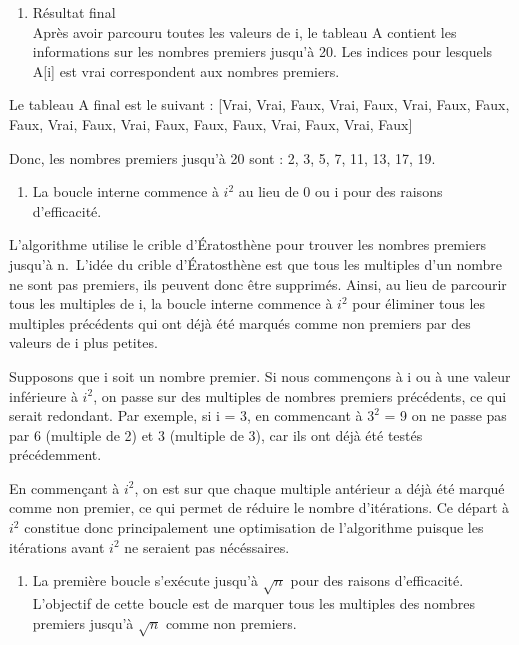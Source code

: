 \documentclass[
    ]{article}
\providecommand{\tightlist}{%
  \setlength{\itemsep}{0pt}\setlength{\parskip}{0pt}}
\begin{document}
\begin{enumerate}
\def\labelenumi{\Alph{enumi})}
\setcounter{enumi}{2}
\tightlist
\item
  Résultat final\\
  Après avoir parcouru toutes les valeurs de i, le tableau A contient
  les informations sur les nombres premiers jusqu'à 20. Les indices pour
  lesquels A{[}i{]} est vrai correspondent aux nombres premiers.
\end{enumerate}

Le tableau A final est le suivant : {[}Vrai, Vrai, Faux, Vrai, Faux,
Vrai, Faux, Faux, Faux, Vrai, Faux, Vrai, Faux, Faux, Faux, Vrai, Faux,
Vrai, Faux{]}

Donc, les nombres premiers jusqu'à 20 sont : 2, 3, 5, 7, 11, 13, 17, 19.

\begin{enumerate}
\def\labelenumi{\arabic{enumi}.}
\setcounter{enumi}{1}
\tightlist
\item
  La boucle interne commence à \(i^2\) au lieu de 0 ou i pour des
  raisons d'efficacité.
\end{enumerate}

L'algorithme utilise le crible d'Ératosthène pour trouver les nombres
premiers jusqu'à n.~L'idée du crible d'Ératosthène est que tous les
multiples d'un nombre ne sont pas premiers, ils peuvent donc être
supprimés. Ainsi, au lieu de parcourir tous les multiples de i, la
boucle interne commence à \(i^2\) pour éliminer tous les multiples
précédents qui ont déjà été marqués comme non premiers par des valeurs
de i plus petites.

Supposons que i soit un nombre premier. Si nous commençons à i ou à une
valeur inférieure à \(i^2\), on passe sur des multiples de nombres
premiers précédents, ce qui serait redondant. Par exemple, si i = 3, en
commencant à \(3^2\) = 9 on ne passe pas par 6 (multiple de 2) et 3
(multiple de 3), car ils ont déjà été testés précédemment.

En commençant à \(i^2\), on est sur que chaque multiple antérieur a déjà
été marqué comme non premier, ce qui permet de réduire le nombre
d'itérations. Ce départ à \(i^2\) constitue donc principalement une
optimisation de l'algorithme puisque les itérations avant \(i^2\) ne
seraient pas nécéssaires.

\begin{enumerate}
\def\labelenumi{\arabic{enumi}.}
\setcounter{enumi}{2}
\tightlist
\item
  La première boucle s'exécute jusqu'à \(\sqrt{n}\) pour des raisons
  d'efficacité. L'objectif de cette boucle est de marquer tous les
  multiples des nombres premiers jusqu'à \(\sqrt{n}\) comme non
  premiers.
\end{enumerate}
\end{document}
